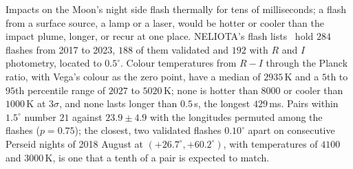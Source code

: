 \documentclass[3p,11pt]{elsarticle}
\begin{document}
Impacts on the Moon's night side flash thermally for tens of milliseconds; a flash from
a surface source, a lamp or a laser, would be hotter or cooler than the impact plume,
longer, or recur at one place. NELIOTA's flash lists~\cite{Liakos2020,Liakos2024} hold
$284$ flashes from 2017 to 2023, $188$ of them validated and $192$ with $R$ and $I$
photometry, located to $0.5^\circ$. Colour temperatures from $R-I$ through the Planck
ratio, with Vega's colour as the zero point, have a median of $2935$\,K and a $5$th to
$95$th percentile range of $2027$ to $5020$\,K; none is hotter than $8000$ or cooler than
$1000$\,K at $3\sigma$, and none lasts longer than $0.5$\,s, the longest $429$\,ms. Pairs
within $1.5^\circ$ number $21$ against $23.9\pm4.9$ with the longitudes permuted among the
flashes ($p=0.75$); the closest, two validated flashes $0.10^\circ$ apart on consecutive
Perseid nights of 2018 August at $(+26.7^\circ,+60.2^\circ)$, with temperatures of $4100$
and $3000$\,K, is one that a tenth of a pair is expected to match.
\end{document}
